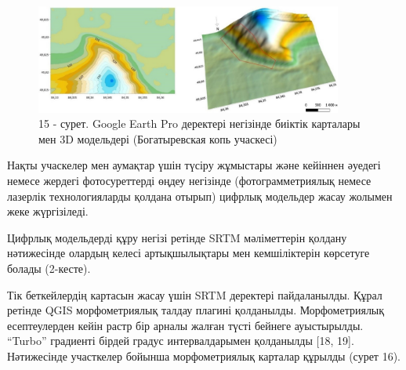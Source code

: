 \begin{figure}[H]
	\centering
	\includegraphics[width=0.9\textwidth]{media/ict2/image218}
	\caption*{15 - сурет. Google Earth Pro деректері негізінде биіктік карталары мен 3D модельдері (Богатыревская копь учаскесі)}
\end{figure}

\begin{multicols}{2}
Нақты учаскелер мен аумақтар үшін түсіру жұмыстары және кейіннен әуедегі
немесе жердегі фотосуреттерді өңдеу негізінде (фотограмметриялық немесе
лазерлік технологияларды қолдана отырып) цифрлық модельдер жасау жолымен
жеке жүргізіледі.

Цифрлық модельдерді құру негізі ретінде SRTM мәліметтерін қолдану
нәтижесінде олардың келесі артықшылықтары мен кемшіліктерін көрсетуге
болады (2-кесте).

Тік беткейлердің картасын жасау үшін SRTM деректері пайдаланылды. Құрал
ретінде QGIS морфометриялық талдау плагині қолданылды. Морфометриялық
есептеулерден кейін растр бір арналы жалған түсті бейнеге ауыстырылды.
``Turbo'' градиенті бірдей градус интервалдарымен қолданылды {[}18,
19{]}. Нәтижесінде участкелер бойынша морфометриялық карталар құрылды
(сурет 16).
\end{multicols}

